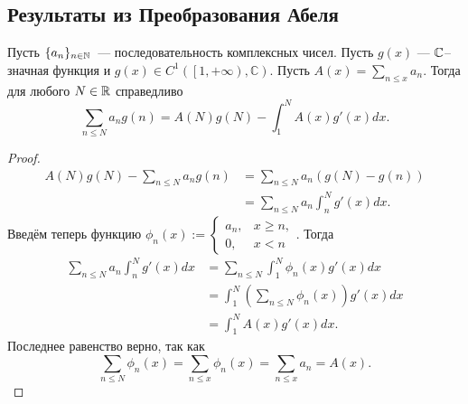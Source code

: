 \subsection{Результаты из Преобразования Абеля}
\label{subsec:4_Zeta-function-Abel}

\begin{nlemma}
\label{lm:I-6}
    Пусть $\{ a_n \}_{n \in \mathbb{N}}$ --- последовательность комплексных чисел. 
    Пусть $g(x)$ --- $\mathbb{C}$--значная функция и $g(x) \in C^1\left( \left[ 1, +\infty \right), \mathbb{C} \right)$. 
    Пусть $A(x) = \sum_{n \le x} a_n$.
    Тогда для любого $N \in \mathbb{R}$ справедливо
    \[
        \sum_{n \le N} a_n g(n) = A(N)g(N) - \int_{1}^{N} A(x)g'(x)dx.
    \]
\end{nlemma}
\begin{proof}
    \begin{align*}
        A(N)g(N) - \sum_{n \le N} a_n g(n) &= \sum_{n \le N} a_n(g(N) - g(n)) \\
        &= \sum_{n \le N} a_n\int_{n}^{N} g'(x)dx.
    \end{align*}
    Введём теперь функцию $\phi_n(x) := 
    \begin{cases}
        a_n, & x \ge n, \\ 
        0, & x < n 
    \end{cases}$. Тогда
    \begin{align*}
        \sum_{n \le N} a_n\int_{n}^{N} g'(x)dx &= \sum_{n \le N} \int_{1}^{N}\phi_n(x)g'(x)dx \\
        &= \int_{1}^{N} \left( \sum_{n \le N} \phi_n(x) \right) g'(x)dx \\
        &= \int_{1}^{N} A(x)g'(x)dx.
    \end{align*}
    Последнее равенство верно, так как 
    \[
        \sum_{n \le N} \phi_n(x) =
        \sum_{n \le x} \phi_n(x) =
        \sum_{n \le x} a_n = A(x).
    \]
\end{proof}

